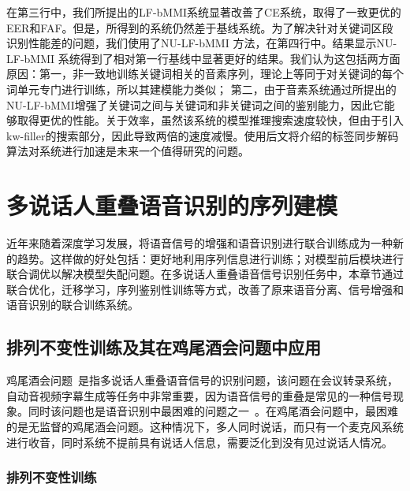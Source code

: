在第三行中，我们所提出的LF-bMMI系统显著改善了CE系统，取得了一致更优的EER和FAF。但是，所得到的系统仍然差于基线系统。为了解决针对关键词区段识别性能差的问题，我们使用了NU-LF-bMMI 方法，在第四行中。结果显示NU-LF-bMMI 系统得到了相对第一行基线中显著更好的结果。我们认为这包括两方面原因：第一，非一致地训练关键词相关的音素序列，理论上等同于对关键词的每个词单元专门进行训练，所以其建模能力类似； 第二，由于音素系统通过所提出的NU-LF-bMMI增强了关键词之间与关键词和非关键词之间的鉴别能力，因此它能够取得更优的性能。关于效率，虽然该系统的模型推理搜索速度较快，但由于引入kw-filler的搜索部分，因此导致两倍的速度减慢。使用后文将介绍的标签同步解码算法对系统进行加速是未来一个值得研究的问题。


\section{多说话人重叠语音识别的序列建模}
\label{chap:intro2-pit}

近年来随着深度学习发展，将语音信号的增强和语音识别进行联合训练成为一种新的趋势。这样做的好处包括：更好地利用序列信息进行训练；对模型前后模块进行联合调优以解决模型失配问题。在多说话人重叠语音信号识别任务中，本章节通过联合优化，迁移学习，序列鉴别性训练等方式，改善了原来语音分离、信号增强和语音识别的联合训练系统。

\subsection{排列不变性训练及其在鸡尾酒会问题中应用}
\label{chap:intro2-pit-pit}

鸡尾酒会问题~\cite{cherry1953some,bregman1994auditory}是指多说话人重叠语音信号的识别问题，该问题在会议转录系统，自动音视频字幕生成等任务中非常重要，因为语音信号的重叠是常见的一种信号现象。同时该问题也是语音识别中最困难的问题之一~\cite{wang2006computational,cooke2010monaural,du2014speech,weng2015deep}。在鸡尾酒会问题中，最困难的是无监督的鸡尾酒会问题。这种情况下，多人同时说话，而只有一个麦克风系统进行收音，同时系统不提前具有说话人信息，需要泛化到没有见过说话人情况。

\subsubsection{排列不变性训练}
\label{chap:intro2-pit-pit-intro}

